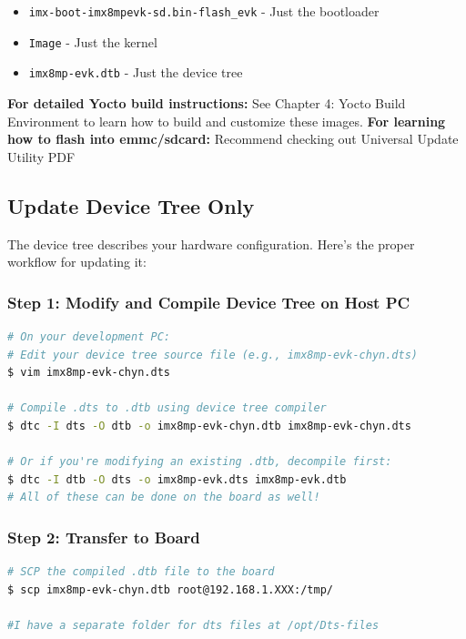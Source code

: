 \documentclass[12pt,a4paper]{report}
\begin{document}
\begin{itemize}
    \item \texttt{imx-boot-imx8mpevk-sd.bin-flash\_evk} - Just the bootloader
    \item \texttt{Image} - Just the kernel
    \item \texttt{imx8mp-evk.dtb} - Just the device tree
\end{itemize}

\begin{docref}
\textbf{For detailed Yocto build instructions:} See Chapter 4: Yocto Build Environment to learn how to build and customize these images.\newline
\textbf{For learning how to flash into emmc/sdcard:} Recommend checking out Universal Update Utility PDF
\end{docref}

\subsection{Update Device Tree Only}

The device tree describes your hardware configuration. Here's the proper workflow for updating it:

\subsubsection{Step 1: Modify and Compile Device Tree on Host PC}

\begin{lstlisting}[language=bash]
# On your development PC:
# Edit your device tree source file (e.g., imx8mp-evk-chyn.dts)
$ vim imx8mp-evk-chyn.dts

# Compile .dts to .dtb using device tree compiler
$ dtc -I dts -O dtb -o imx8mp-evk-chyn.dtb imx8mp-evk-chyn.dts

# Or if you're modifying an existing .dtb, decompile first:
$ dtc -I dtb -O dts -o imx8mp-evk.dts imx8mp-evk.dtb
# All of these can be done on the board as well!
\end{lstlisting}

\subsubsection{Step 2: Transfer to Board}

\begin{lstlisting}[language=bash]
# SCP the compiled .dtb file to the board
$ scp imx8mp-evk-chyn.dtb root@192.168.1.XXX:/tmp/

#I have a separate folder for dts files at /opt/Dts-files
\end{lstlisting}
\end{document}

